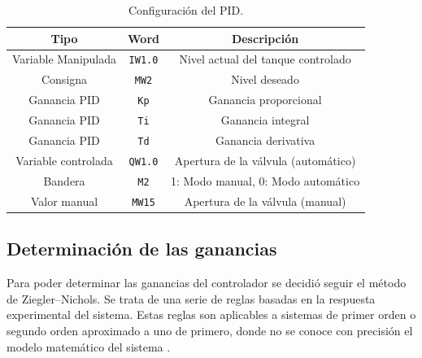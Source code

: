 \begin{table}[!t]
\renewcommand{\arraystretch}{1.3}
\centering
\begin{tabular}{c||c||c}
\hline
\bfseries Tipo & \bfseries Word  & \bfseries Descripción\\
\hline \hline
Variable Manipulada & \verb|IW1.0|  & Nivel actual del tanque controlado\\
Consigna & \verb|MW2|  & Nivel deseado\\
Ganancia PID & \verb|Kp|  & Ganancia proporcional\\
Ganancia PID & \verb|Ti|  & Ganancia integral\\
Ganancia PID & \verb|Td|  & Ganancia derivativa\\
Variable controlada & \verb|QW1.0|  &  Apertura de la válvula (automático)\\
Bandera & \verb|M2|  & 1: Modo manual, 0: Modo automático \\
Valor manual & \verb|MW15|  & Apertura de la válvula (manual)\\
\hline
\end{tabular}
\caption{Configuración del PID.}
\label{table:controladorpid}
\end{table}

\subsection{Determinación de las ganancias}
\label{subsec:ZiegerNichols}
Para poder determinar las ganancias del controlador se decidió seguir el método
de Ziegler–Nichols.
Se trata de una serie de reglas basadas en la respuesta experimental
del sistema.
Estas reglas son aplicables a sistemas de primer orden o segundo orden aproximado 
a uno de primero, donde no se conoce con
precisión el modelo matemático del sistema \cite{bib:Ogata}.


